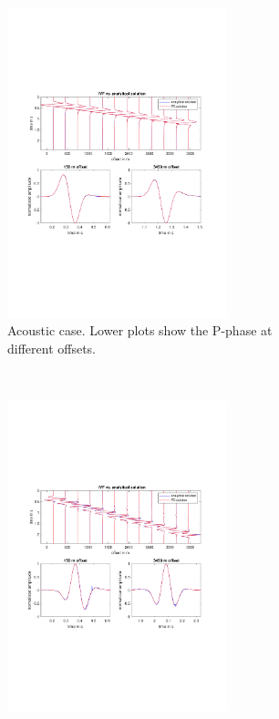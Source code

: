 \documentclass[pdftex,a4paper,parskip,listof=totoc,bibliography=totoc,onehalfspacing,12pt]{scrreprt}
\begin{document}
\begin{figure}
  \centering
  \begin{subfigure}[b]{1.0\textwidth}
    \centering
    \includegraphics[width=0.7\textwidth,trim=2cm 7cm 2cm 7cm, clip=true]{images/fd_vs_analytic_acoustic_IVF.pdf}
    \caption{Acoustic case. Lower plots show the P-phase at different offsets.}
  \end{subfigure} \\
  \begin{subfigure}[b]{1.0\textwidth}
    \centering
    \includegraphics[width=0.7\textwidth,trim=2cm 7cm 2cm 7cm, clip=true]{images/fd_vs_analytic_elastic_IVF.pdf}

\end{subfigure}
\end{figure}
\end{document}
